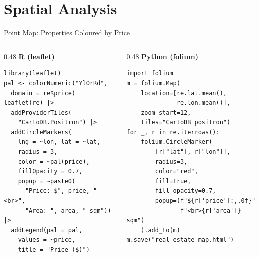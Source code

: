 \documentclass[10pt]{beamer}
\begin{document}
\section{Spatial Analysis}
\begin{frame}[fragile]{Point Map: Properties Coloured by Price}
\begin{columns}[T]
\begin{column}{0.48\textwidth}
\textbf{R (leaflet)}
\begin{lstlisting}[style=rstyle]
library(leaflet)
pal <- colorNumeric("YlOrRd",
  domain = re$price)
leaflet(re) |>
  addProviderTiles(
    "CartoDB.Positron") |>
  addCircleMarkers(
    lng = ~lon, lat = ~lat,
    radius = 3,
    color = ~pal(price),
    fillOpacity = 0.7,
    popup = ~paste0(
      "Price: $", price, "<br>",
      "Area: ", area, " sqm")) |>
  addLegend(pal = pal,
    values = ~price,
    title = "Price ($)")
\end{lstlisting}
\end{column}
\begin{column}{0.48\textwidth}
\textbf{Python (folium)}
\begin{lstlisting}[style=pythonstyle]
import folium
m = folium.Map(
    location=[re.lat.mean(),
              re.lon.mean()],
    zoom_start=12,
    tiles="CartoDB positron")
for _, r in re.iterrows():
    folium.CircleMarker(
        [r["lat"], r["lon"]],
        radius=3,
        color="red",
        fill=True,
        fill_opacity=0.7,
        popup=(f"${r['price']:,.0f}"
               f"<br>{r['area']} sqm")
    ).add_to(m)
m.save("real_estate_map.html")
\end{lstlisting}
\end{column}
\end{columns}
\end{frame}
\end{document}
